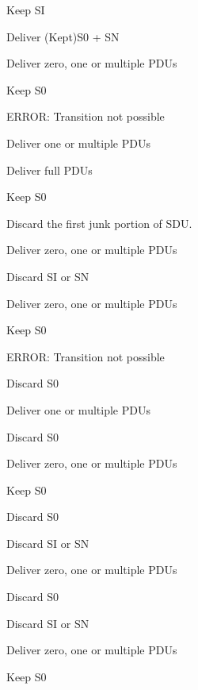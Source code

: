 Keep SI

Deliver (Kept)S0 + SN

Deliver zero, one or multiple P\+D\+Us

Keep S0

E\+R\+R\+OR\+: Transition not possible

Deliver one or multiple P\+D\+Us

Deliver full P\+D\+Us

Keep S0

Discard the first junk portion of S\+DU.

Deliver zero, one or multiple P\+D\+Us

Discard SI or SN

Deliver zero, one or multiple P\+D\+Us

Keep S0

E\+R\+R\+OR\+: Transition not possible

Discard S0

Deliver one or multiple P\+D\+Us

Discard S0

Deliver zero, one or multiple P\+D\+Us

Keep S0

Discard S0

Discard SI or SN

Deliver zero, one or multiple P\+D\+Us

Discard S0

Discard SI or SN

Deliver zero, one or multiple P\+D\+Us

Keep S0


